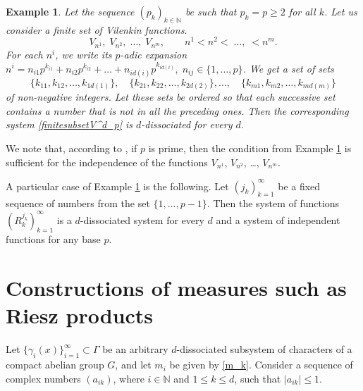 \documentclass[12pt]{article}
\newtheorem{exmpl}{Example}
\begin{document}
	\begin{exmpl} \label{prikol} Let the sequence $(p_k)_{k\in\mathbb{N}}$ be such that $p_k= p\ge 2$ for all $k$. Let us consider a finite set of Vilenkin functions.
		\begin{equation} 
			\label{finitesubsetV^d_p}
			V_{n^1}, \; V_{n^2}, \; \ldots, \; V_{n^m}, 
			\qquad 
			n^1 < n^2 < \; \ldots, \; < n^m. 
		\end{equation}
		For each $n^i$, we write its $p$-adic expansion $ 
		n^i = n_{i1} p^{k_{i1}} + n_{i2} p^{k_{i2}} + \ldots + n_{id(i)} p^{k_{id(i)}}, \;
		n_{ij} \in \{1, \ldots, p\}$.
		We get a set of sets
		\[
		\{ k_{11}, k_{12}, \ldots, k_{1d(1)}\}, 
		\quad 
		\{ k_{21}, k_{22}, \ldots, k_{2d(2)}\}, 
		\ldots, 
		\quad 
		\{ k_{m1}, k_{m2}, \ldots, k_{md(m)} \} 
		\]   of non-negative integers. Let these sets be ordered so that each successive set contains a number that is not in all the preceding ones. Then the corresponding system \eqref{finitesubsetV^d_p} is $d$-dissociated for every $d$.
	\end{exmpl}
	
	We note that, according to \cite{Kazakova-2}, if $p$ is prime, then the condition from Example \ref{prikol} is sufficient for the independence of the functions $V_{n^1}$, $V_{n^2}$, \ldots, $V_{n^m}$.
	
	A particular case of Example \ref{prikol} is the following. Let $(j_k)_{k=1}^{\infty}$ be a fixed sequence of numbers from the set $\{1, \ldots, p-1\}$. Then the system of functions $(R_k^{j_k})_{k=1}^{\infty}$ is a $d$-dissociated system for every $d$ and a system of independent functions for any base $p$.
	\section{Constructions of measures such as Riesz products} \label{section-2}
Let $\{\gamma_{i}(x)\}_{i=1}^{\infty} \subset \Gamma$ be an arbitrary $d$-dissociated subsystem of characters of a compact abelian group $G$, and let $m_i$ be given by \eqref{m_k}. Consider a sequence of complex numbers $(a_{ik})$, where $i \in \mathbb{N}$ and $1 \le k \le d$, such that $|a_{ik}| \le 1.$
	
\end{document}
